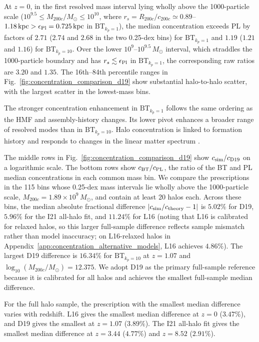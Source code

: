 \documentclass[
 reprint,
 superscriptaddress,
 nofootinbib,
 nobibnotes,
 amsmath,
 amssymb,
 aps,
 prd,
 floatfix,
 longbibliography
]{revtex4-2}
\DeclareRobustCommand{\change}[1]{#1}
\DeclareRobustCommand{\BTKPone}{\ensuremath{\mathrm{BT}_{k_p=1}}}
\DeclareRobustCommand{\BTKPten}{\ensuremath{\mathrm{BT}_{k_p=10}}}
\begin{document}
At \(z=0\), in the first resolved mass interval lying wholly above the 1000-particle scale (\(10^{9.5}\le M_{200c}/M_\odot\le10^{10}\), where \(r_s=R_{200c}/c_{200c}\simeq0.89\)--\(1.18\,{\rm kpc}>\epsilon_{\rm Pl}=0.725\,{\rm kpc}\) in \BTKPone{}), the median concentration exceeds PL by factors of \(2.71\) (\(2.74\) and \(2.68\) in the two 0.25-dex bins) for \BTKPone{} and \(1.19\) (\(1.21\) and \(1.16\)) for \BTKPten{}. Over the lower \(10^9\)--\(10^{9.5}\,M_\odot\) interval, which straddles the 1000-particle boundary and has \(r_s\lesssim\epsilon_{\rm Pl}\) in \BTKPone{}, the corresponding raw ratios are \(3.20\) and \(1.35\). The 16th--84th percentile ranges in Fig.~\ref{fig:concentration_comparison_d19} show substantial halo-to-halo scatter, with the largest scatter in the lowest-mass bins.


The stronger concentration enhancement in \BTKPone{} follows the same ordering as the HMF and assembly-history changes. Its lower pivot enhances a broader range of resolved modes than in \BTKPten{}. Halo concentration is linked to formation history and responds to changes in the linear matter spectrum \citep{Ludlow2016WDMConcentration,Brown2020HaloPPS}.


\change{The middle rows in Fig.~\ref{fig:concentration_comparison_d19} show \(c_{\rm sim}/c_{\rm D19}\) on a logarithmic scale. The bottom rows show \(c_{\rm BT}/c_{\rm PL}\), the ratio of the BT and PL median concentrations in each common mass bin.} \change{We compare the prescriptions in the 115 bins whose 0.25-dex mass intervals lie wholly above the 1000-particle scale, \(M_{200c}=1.89\times10^9\,M_\odot\), and contain at least 20 halos each. Across these bins, the median absolute fractional difference \(\lvert c_{\rm sim}/c_{\rm theory}-1\rvert\) is \(5.02\%\) for D19, \(5.96\%\) for the I21 all-halo fit, and \(11.24\%\) for L16 (noting that L16 is calibrated for relaxed halos, so this larger full-sample difference reflects sample mismatch rather than model inaccuracy; on L16-relaxed halos in Appendix~\ref{app:concentration_alternative_models}, L16 achieves \(4.86\%\)). The largest D19 difference is \(16.34\%\) for \BTKPten{} at \(z=1.07\) and \(\log_{10}(M_{200c}/M_\odot)=12.375\). We adopt D19 as the primary full-sample reference because it is calibrated for all halos and achieves the smallest full-sample median difference.}

\change{For the full halo sample, the prescription with the smallest median difference varies with redshift. L16 gives the smallest median difference at \(z=0\) (\(3.47\%\)), and D19 gives the smallest at \(z=1.07\) (\(3.89\%\)). The I21 all-halo fit gives the smallest median difference at \(z=3.44\) (\(4.77\%\)) and \(z=8.52\) (\(2.91\%\)).}
\end{document}
